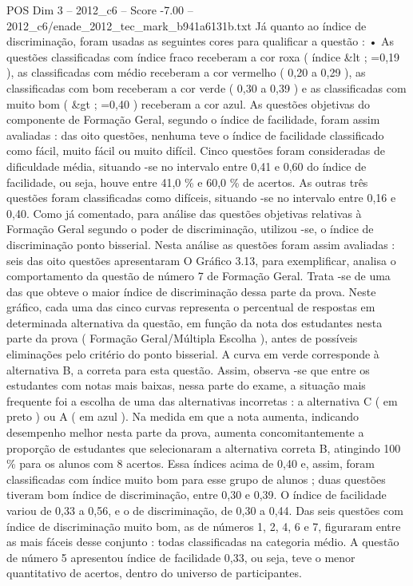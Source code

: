\begin{textsample}{POS Dim 3 – 2012\_c6 – Score -7.00 – 2012\_c6/enade\_2012\_tec\_mark\_b941a6131b.txt}
Já quanto ao índice de discriminação, foram usadas as seguintes cores para qualificar a questão : • As questões classificadas com índice fraco receberam a cor roxa ( índice \&lt ; =0,19 ), as classificadas com médio receberam a cor vermelho ( 0,20 a 0,29 ), as classificadas com bom receberam a cor verde ( 0,30 a 0,39 ) e as classificadas com muito bom ( \&gt ; =0,40 ) receberam a cor azul.
As questões objetivas do componente de Formação Geral, segundo o índice de facilidade, foram assim avaliadas : das oito questões, nenhuma teve o índice de facilidade classificado como fácil, muito fácil ou muito difícil.
Cinco questões foram consideradas de dificuldade média, situando -se no intervalo entre 0,41 e 0,60 do índice de facilidade, ou seja, houve entre 41,0 \% e 60,0 \% de acertos.
As outras três questões foram classificadas como difíceis, situando -se no intervalo entre 0,16 e 0,40.
Como já comentado, para análise das questões objetivas relativas à Formação Geral segundo o poder de discriminação, utilizou -se, o índice de discriminação ponto bisserial.
Nesta análise as questões foram assim avaliadas : seis das oito questões apresentaram O Gráfico 3.13, para exemplificar, analisa o comportamento da questão de número 7 de Formação Geral.
Trata -se de uma das que obteve o maior índice de discriminação dessa parte da prova.
Neste gráfico, cada uma das cinco curvas representa o percentual de respostas em determinada alternativa da questão, em função da nota dos estudantes nesta parte da prova ( Formação Geral/Múltipla Escolha ), antes de possíveis eliminações pelo critério do ponto bisserial.
A curva em verde corresponde à alternativa B, a correta para esta questão.
Assim, observa -se que entre os estudantes com notas mais baixas, nessa parte do exame, a situação mais frequente foi a escolha de uma das alternativas incorretas : a alternativa C ( em preto ) ou A ( em azul ).
Na medida em que a nota aumenta, indicando desempenho melhor nesta parte da prova, aumenta concomitantemente a proporção de estudantes que selecionaram a alternativa correta B, atingindo 100 \% para os alunos com 8 acertos.
Essa índices acima de 0,40 e, assim, foram classificadas com índice muito bom para esse grupo de alunos ; duas questões tiveram bom índice de discriminação, entre 0,30 e 0,39.
O índice de facilidade variou de 0,33 a 0,56, e o de discriminação, de 0,30 a 0,44.
Das seis questões com índice de discriminação muito bom, as de números 1, 2, 4, 6 e 7, figuraram entre as mais fáceis desse conjunto : todas classificadas na categoria médio.
A questão de número 5 apresentou índice de facilidade 0,33, ou seja, teve o menor quantitativo de acertos, dentro do universo de participantes.

\end{textsample}
